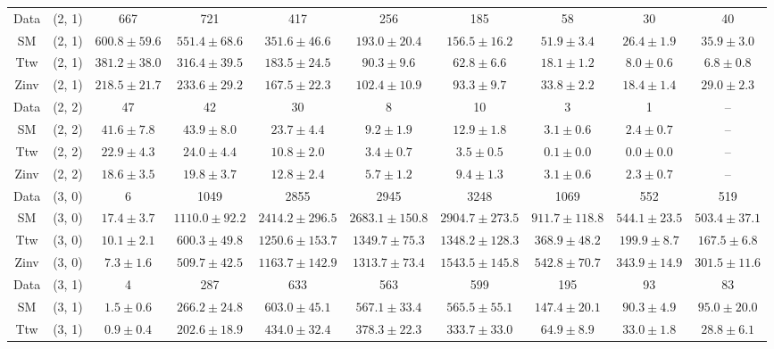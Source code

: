 \begin{table}[h!]
{\begin{tabular}{cccccccccc}
	Data & (2, 1) & 667 & 721 & 417 & 256 & 185 & 58 & 30 & 40 \\[0.5ex] 
	SM & (2, 1) & $600.8\pm 59.6$ & $551.4\pm 68.6$ & $351.6\pm 46.6$ & $193.0\pm 20.4$ & $156.5\pm 16.2$ & $51.9\pm 3.4$ & $26.4\pm 1.9$ & $35.9\pm 3.0$ \\[0.5ex] 
	Ttw & (2, 1) & $381.2\pm 38.0$ & $316.4\pm 39.5$ & $183.5\pm 24.5$ & $90.3\pm 9.6$ & $62.8\pm 6.6$ & $18.1\pm 1.2$ & $8.0\pm 0.6$ & $6.8\pm 0.8$ \\[0.5ex] 
	Zinv & (2, 1) & $218.5\pm 21.7$ & $233.6\pm 29.2$ & $167.5\pm 22.3$ & $102.4\pm 10.9$ & $93.3\pm 9.7$ & $33.8\pm 2.2$ & $18.4\pm 1.4$ & $29.0\pm 2.3$ \\[0.5ex] 
	Data & (2, 2) & 47 & 42 & 30 & 8 & 10 & 3 & 1 & -- \\[0.5ex] 
	SM & (2, 2) & $41.6\pm 7.8$ & $43.9\pm 8.0$ & $23.7\pm 4.4$ & $9.2\pm 1.9$ & $12.9\pm 1.8$ & $3.1\pm 0.6$ & $2.4\pm 0.7$ & -- \\[0.5ex] 
	Ttw & (2, 2) & $22.9\pm 4.3$ & $24.0\pm 4.4$ & $10.8\pm 2.0$ & $3.4\pm 0.7$ & $3.5\pm 0.5$ & $0.1\pm 0.0$ & $0.0\pm 0.0$ & -- \\[0.5ex] 
	Zinv & (2, 2) & $18.6\pm 3.5$ & $19.8\pm 3.7$ & $12.8\pm 2.4$ & $5.7\pm 1.2$ & $9.4\pm 1.3$ & $3.1\pm 0.6$ & $2.3\pm 0.7$ & -- \\[0.5ex] 
	Data & (3, 0) & 6 & 1049 & 2855 & 2945 & 3248 & 1069 & 552 & 519 \\[0.5ex] 
	SM & (3, 0) & $17.4\pm 3.7$ & $1110.0\pm 92.2$ & $2414.2\pm 296.5$ & $2683.1\pm 150.8$ & $2904.7\pm 273.5$ & $911.7\pm 118.8$ & $544.1\pm 23.5$ & $503.4\pm 37.1$ \\[0.5ex] 
	Ttw & (3, 0) & $10.1\pm 2.1$ & $600.3\pm 49.8$ & $1250.6\pm 153.7$ & $1349.7\pm 75.3$ & $1348.2\pm 128.3$ & $368.9\pm 48.2$ & $199.9\pm 8.7$ & $167.5\pm 6.8$ \\[0.5ex] 
	Zinv & (3, 0) & $7.3\pm 1.6$ & $509.7\pm 42.5$ & $1163.7\pm 142.9$ & $1313.7\pm 73.4$ & $1543.5\pm 145.8$ & $542.8\pm 70.7$ & $343.9\pm 14.9$ & $301.5\pm 11.6$ \\[0.5ex] 
	Data & (3, 1) & 4 & 287 & 633 & 563 & 599 & 195 & 93 & 83 \\[0.5ex] 
	SM & (3, 1) & $1.5\pm 0.6$ & $266.2\pm 24.8$ & $603.0\pm 45.1$ & $567.1\pm 33.4$ & $565.5\pm 55.1$ & $147.4\pm 20.1$ & $90.3\pm 4.9$ & $95.0\pm 20.0$ \\[0.5ex] 
	Ttw & (3, 1) & $0.9\pm 0.4$ & $202.6\pm 18.9$ & $434.0\pm 32.4$ & $378.3\pm 22.3$ & $333.7\pm 33.0$ & $64.9\pm 8.9$ & $33.0\pm 1.8$ & $28.8\pm 6.1$ \\[0.5ex] 

\end{tabular}}
\end{table}
